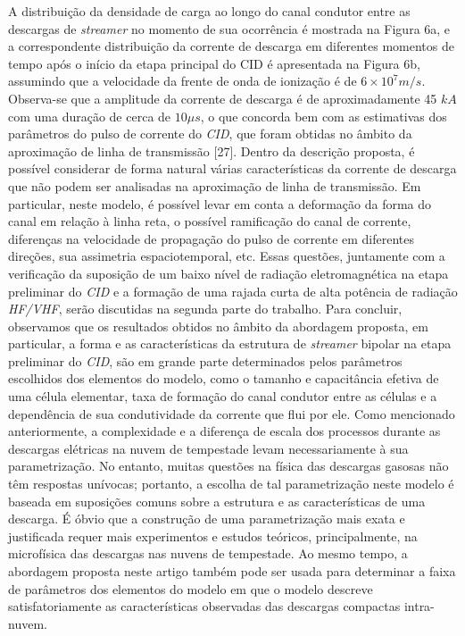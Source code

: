 \documentclass[a4paper, 12pt, onecolumn,singlespacing]{article}
\begin{document}
	A distribuição da densidade de carga ao longo do canal condutor entre as descargas de \textit{streamer} no momento de sua ocorrência é mostrada na Figura 6a, e a correspondente distribuição da corrente de descarga em diferentes momentos de tempo após o início da etapa principal do CID é apresentada na Figura 6b, assumindo que a velocidade da frente de onda de ionização é de $6 \times 10^7 m/s$. Observa-se que a amplitude da corrente de descarga é de aproximadamente 45 $kA$ com uma duração de cerca de $10 \mu s$, o que concorda bem com as estimativas dos parâmetros do pulso de corrente do \textit{CID}, que foram obtidas no âmbito da aproximação de linha de transmissão [27]. Dentro da descrição proposta, é possível considerar de forma natural várias características da corrente de descarga que não podem ser analisadas na aproximação de linha de transmissão. Em particular, neste modelo, é possível levar em conta a deformação da forma do canal em relação à linha reta, o possível ramificação do canal de corrente, diferenças na velocidade de propagação do pulso de corrente em diferentes direções, sua assimetria espaciotemporal, etc. Essas questões, juntamente com a verificação da suposição de um baixo nível de radiação eletromagnética na etapa preliminar do \textit{CID} e a formação de uma rajada curta de alta potência de radiação \textit{HF/VHF}, serão discutidas na segunda parte do trabalho. Para concluir, observamos que os resultados obtidos no âmbito da abordagem proposta, em particular, a forma e as características da estrutura de \textit{streamer} bipolar na etapa preliminar do \textit{CID}, são em grande parte determinados pelos parâmetros escolhidos dos elementos do modelo, como o tamanho e capacitância efetiva de uma célula elementar, taxa de formação do canal condutor entre as células e a dependência de sua condutividade da corrente que flui por ele. Como mencionado anteriormente, a complexidade e a diferença de escala dos processos durante as descargas elétricas na nuvem de tempestade levam necessariamente à sua parametrização. No entanto, muitas questões na física das descargas gasosas não têm respostas unívocas; portanto, a escolha de tal parametrização neste modelo é baseada em suposições comuns sobre a estrutura e as características de uma descarga. É óbvio que a construção de uma parametrização mais exata e justificada requer mais experimentos e estudos teóricos, principalmente, na microfísica das descargas nas nuvens de tempestade. Ao mesmo tempo, a abordagem proposta neste artigo também pode ser usada para determinar a faixa de parâmetros dos elementos do modelo em que o modelo descreve satisfatoriamente as características observadas das descargas compactas intra-nuvem.
	
\end{document}
